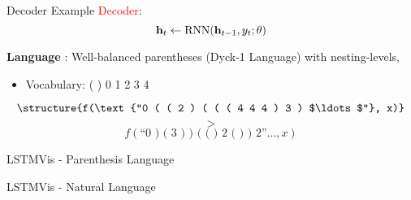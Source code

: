 \begin{frame}{Decoder Example }
  \textcolor{red}{Decoder}:
  \[{\mathbf{h}_t \gets \operatorname*{RNN}(\mathbf{h}_{t-1}, y_t; \theta)} \]

  \air

  \textbf{Language} : Well-balanced parentheses (Dyck-1 Language) with  nesting-levels,
  \begin{itemize}
  \item Vocabulary: ( ) 0 1 2 3 4
  \end{itemize}


  \[\structure{f(\text{``0 ( ( 2 ) ( ( ( 4 4 4 ) 3 ) $\ldots$''}, x)}\]
  \[>\]
  \[f(\text{``0 ) ( 3 ) ) ( ( ) 2 ( ) ) 2''$\dots$}, x) \]


\end{frame}

\begin{frame}{LSTMVis - Parenthesis Language}
  \vspace{-0.25cm}

  \begin{center}
  \end{center}
\end{frame}











\begin{frame}{LSTMVis - Natural Language}
  \vspace{-0.25cm}

  \begin{center}
  \end{center}
\end{frame}


